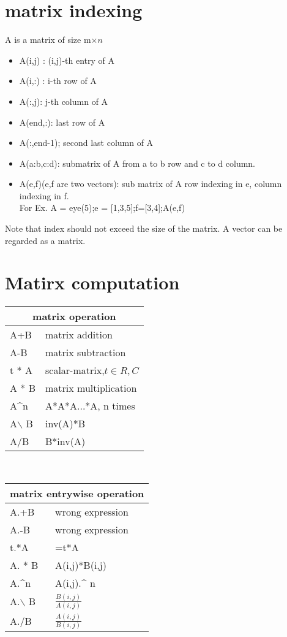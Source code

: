 \documentclass{article}
\begin{document}
 \section{matrix indexing}
   A is a matrix of size m$\times n$
   \begin{itemize}
     \item A(i,j) : (i,j)-th entry of A
     \item A(i,:) : i-th row of A
     \item A(:,j): j-th column of A
     \item A(end,:): last row of A
           \item A(:,end-1); second last column of A
     \item A(a:b,c:d): submatrix of A from a to b row and c to d column.
           
     \item A(e,f)(e,f are two vectors): sub matrix of A row indexing in e, column indexing in f.\\
           For Ex.
           A = eye(5);e = [1,3,5];f=[3,4];A(e,f)
   \end{itemize}
   Note that index should not exceed the size of the matrix. A vector can be regarded as a matrix.
 
 \section{Matirx computation}
   \small
   
   \begin{tabularx}{\linewidth}{XX}\toprule
     \multicolumn{2}{c}{matrix  operation}\\\midrule
     A+B &matrix addition\\\midrule
A-B &matrix subtraction\\\midrule
t * A& scalar-matrix,$t\in R,C$\\\midrule
A * B& matrix multiplication\\\midrule
A\^{}n & A*A*A...*A, n times\\\midrule
A$\backslash$ B & inv(A)*B\\\midrule
A/B& B*inv(A)\\\bottomrule
\end{tabularx}
\\
\begin{tabularx}{\linewidth}{XX}\toprule
       \multicolumn{2}{c}{matrix  entrywise operation}\\\midrule
     A.+B &wrong expression\\\midrule
A.-B &wrong expression\\\midrule
t.*A&=t*A\\\midrule
A. * B& A(i,j)*B(i,j)\\\midrule
A.\^{}n & A(i,j).\^{} n\\\midrule
A.$\backslash$ B &$\frac{B(i,j)}{A(i,j)}$\\\midrule
A./B& $\frac{A(i,j)}{B(i,j)}$\\\bottomrule
   \end{tabularx}
 
\end{document}
